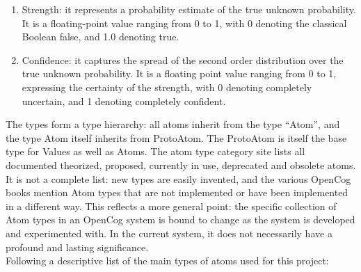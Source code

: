 \begin{enumerate}
	\item Strength: it represents a probability estimate of the true unknown probability. It is a floating-point value ranging from 0 to 1, with 0 denoting the classical Boolean false, and 1.0 denoting true.
	\item Confidence: it captures the spread of the second order distribution over the true unknown probability. It is a floating point value ranging from 0 to 1, expressing the certainty of the strength, with 0 denoting completely uncertain, and 1 denoting completely confident.
\end{enumerate}

The types form a type hierarchy: all atoms inherit from the type \enquote{Atom}, and the type Atom itself inherits from ProtoAtom. The ProtoAtom is itself the base type for Values as well as Atoms.
The atom type category site\footnotemark{} lists all documented theorized, proposed, currently in use, deprecated and obsolete atoms. \\
It is not a complete list: new types are easily invented, and the various OpenCog books mention Atom types that are not implemented or have been implemented in a different way. This reflects a more general point: the specific collection of Atom types in an OpenCog system is bound to change as the system is developed and experimented with. In the current system, it does not necessarily have a profound and lasting significance. \\

Following a descriptive list of the main types of atoms used for this project:

